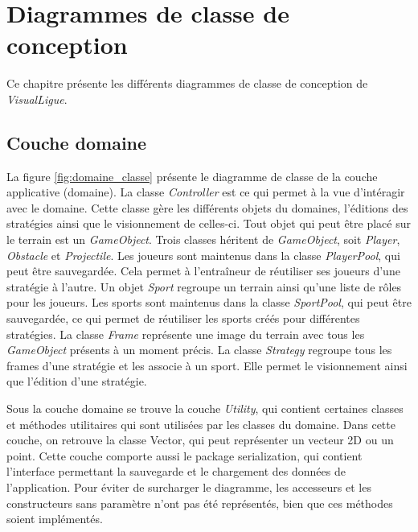 
\chapter{Diagrammes de classe de conception}
\label{s:classe_conception}

Ce chapitre présente les différents diagrammes de classe de conception de \textit{VisualLigue}.

\section{Couche domaine}
\label{couche_domaine}

La figure \ref{fig:domaine_classe} présente le diagramme de classe de la couche applicative (domaine).
La classe \textit{Controller} est ce qui permet à la vue d'intéragir avec le domaine.
Cette classe gère les différents objets du domaines, l'éditions des stratégies ainsi que le visionnement de celles-ci.
Tout objet qui peut être placé sur le terrain est un \textit{GameObject}.
Trois classes héritent de \textit{GameObject}, soit \textit{Player}, \textit{Obstacle} et \textit{Projectile}.
Les joueurs sont maintenus dans la classe \textit{PlayerPool}, qui peut être sauvegardée.
Cela permet à l'entraîneur de réutiliser ses joueurs d'une stratégie à l'autre.
Un objet \textit{Sport} regroupe un terrain ainsi qu'une liste de rôles pour les joueurs.
Les sports sont maintenus dans la classe \textit{SportPool}, qui peut être sauvegardée, ce qui permet de réutiliser les sports créés pour différentes stratégies.
La classe \textit{Frame} représente une image du terrain avec tous les \textit{GameObject} présents à un moment précis.
La classe \textit{Strategy} regroupe tous les frames d'une stratégie et les associe à un sport.
Elle permet le visionnement ainsi que l'édition d'une stratégie.

Sous la couche domaine se trouve la couche \textit{Utility}, qui contient certaines classes et méthodes utilitaires qui sont utilisées par les classes du domaine.
Dans cette couche, on retrouve la classe Vector, qui peut représenter un vecteur 2D ou un point.
Cette couche comporte aussi le package serialization, qui contient l'interface permettant la sauvegarde et le chargement des données de l'application.
Pour éviter de surcharger le diagramme, les accesseurs et les constructeurs sans paramètre n'ont pas été représentés, bien que ces méthodes soient implémentés.

